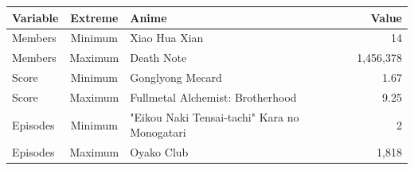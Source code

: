\begin{tabular}{lcp{2.6cm}r}
\toprule
Variable & Extreme & Anime & Value
\\
\midrule
Members & Minimum & Xiao Hua Xian & 14
\\
Members & Maximum & Death Note & 1,456,378
\\
Score & Minimum & Gonglyong Mecard & 1.67
\\
Score & Maximum & Fullmetal Alchemist: Brotherhood & 9.25
\\
Episodes & Minimum & "Eikou Naki Tensai-tachi" Kara no Monogatari & 2
\\
Episodes & Maximum & Oyako Club & 1,818
\\
\bottomrule
\end{tabular}
